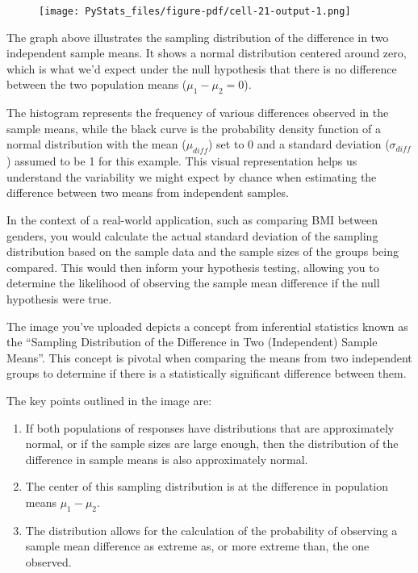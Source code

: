 \documentclass[
  letterpaper,
  DIV=11,
  numbers=noendperiod]{scrartcl}
\providecommand{\tightlist}{%
  \setlength{\itemsep}{0pt}\setlength{\parskip}{0pt}}\usepackage{longtable,booktabs,array}
\begin{document}
\begin{figure}[H]

{\centering \texttt{[image: PyStats\_files/figure-pdf/cell-21-output-1.png]}

}

\end{figure}

The graph above illustrates the sampling distribution of the difference
in two independent sample means. It shows a normal distribution centered
around zero, which is what we'd expect under the null hypothesis that
there is no difference between the two population means
(\(\mu_1 - \mu_2 = 0\)).

The histogram represents the frequency of various differences observed
in the sample means, while the black curve is the probability density
function of a normal distribution with the mean (\(\mu_{diff}\)) set to
0 and a standard deviation (\(\sigma_{diff}\)) assumed to be 1 for this
example. This visual representation helps us understand the variability
we might expect by chance when estimating the difference between two
means from independent samples.

In the context of a real-world application, such as comparing BMI
between genders, you would calculate the actual standard deviation of
the sampling distribution based on the sample data and the sample sizes
of the groups being compared. This would then inform your hypothesis
testing, allowing you to determine the likelihood of observing the
sample mean difference if the null hypothesis were true.

The image you've uploaded depicts a concept from inferential statistics
known as the ``Sampling Distribution of the Difference in Two
(Independent) Sample Means''. This concept is pivotal when comparing the
means from two independent groups to determine if there is a
statistically significant difference between them.

The key points outlined in the image are:

\begin{enumerate}
\def\labelenumi{\arabic{enumi}.}
\tightlist
\item
  If both populations of responses have distributions that are
  approximately normal, or if the sample sizes are large enough, then
  the distribution of the difference in sample means is also
  approximately normal.
\item
  The center of this sampling distribution is at the difference in
  population means \(\mu_1 - \mu_2\).
\item
  The distribution allows for the calculation of the probability of
  observing a sample mean difference as extreme as, or more extreme
  than, the one observed.
\end{enumerate}
\end{document}
